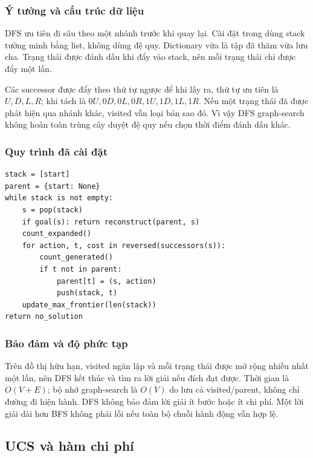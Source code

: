 \documentclass[a4paper]{article}
\newcommand{\tep}[1]{{\small\ttfamily\detokenize{#1}}}
\begin{document}
\subsubsection{Ý tưởng và cấu trúc dữ liệu}
DFS ưu tiên đi sâu theo một nhánh trước khi quay lại. Cài đặt trong \tep{dfs_solver.py} dùng stack tường minh bằng list, không dùng đệ quy. Dictionary \tep{parent} vừa là tập đã thăm vừa lưu cha. Trạng thái được đánh dấu khi đẩy vào stack, nên mỗi trạng thái chỉ được đẩy một lần.

Các successor được đẩy theo thứ tự ngược để khi lấy ra, thứ tự ưu tiên là $U,D,L,R$; khi tách là $0U,0D,0L,0R,1U,1D,1L,1R$. Nếu một trạng thái đã được phát hiện qua nhánh khác, visited vẫn loại bản sao đó. Vì vậy DFS graph-search không hoàn toàn trùng cây duyệt đệ quy nếu chọn thời điểm đánh dấu khác.

\subsubsection{Quy trình đã cài đặt}
\par\noindent\begin{minipage}{\textwidth}
\begin{lstlisting}[caption={DFS: visited khi đẩy, kiểm tra đích khi lấy ra.}]
stack = [start]
parent = {start: None}
while stack is not empty:
    s = pop(stack)
    if goal(s): return reconstruct(parent, s)
    count_expanded()
    for action, t, cost in reversed(successors(s)):
        count_generated()
        if t not in parent:
            parent[t] = (s, action)
            push(stack, t)
    update_max_frontier(len(stack))
return no_solution
\end{lstlisting}
\end{minipage}\par\medskip

\subsubsection{Bảo đảm và độ phức tạp}
Trên đồ thị hữu hạn, visited ngăn lặp và mỗi trạng thái được mở rộng nhiều nhất một lần, nên DFS kết thúc và tìm ra lời giải nếu đích đạt được. Thời gian là $O(V+E)$; bộ nhớ graph-search là $O(V)$ do lưu cả visited/parent, không chỉ đường đi hiện hành. DFS không bảo đảm lời giải ít bước hoặc ít chi phí. Một lời giải dài hơn BFS không phải lỗi nếu toàn bộ chuỗi hành động vẫn hợp lệ.




\subsection{UCS và hàm chi phí}
\end{document}
